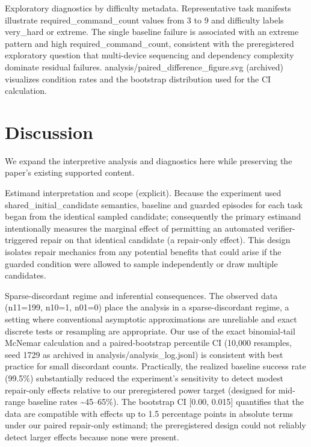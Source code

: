 \documentclass[conference]{IEEEtran}
\begin{document}
Exploratory diagnostics by difficulty metadata. Representative task manifests illustrate required\_command\_count values from 3 to 9 and difficulty labels very\_hard or extreme. The single baseline failure is associated with an extreme pattern and high required\_command\_count, consistent with the preregistered exploratory question that multi-device sequencing and dependency complexity dominate residual failures. analysis/paired\_difference\_figure.svg (archived) visualizes condition rates and the bootstrap distribution used for the CI calculation.

\section{Discussion}
We expand the interpretive analysis and diagnostics here while preserving the paper's existing supported content.

Estimand interpretation and scope (explicit). Because the experiment used shared\_initial\_candidate semantics, baseline and guarded episodes for each task began from the identical sampled candidate; consequently the primary estimand intentionally measures the marginal effect of permitting an automated verifier-triggered repair on that identical candidate (a repair-only effect). This design isolates repair mechanics from any potential benefits that could arise if the guarded condition were allowed to sample independently or draw multiple candidates.

Sparse-discordant regime and inferential consequences. The observed data (n11=199, n10=1, n01=0) place the analysis in a sparse-discordant regime, a setting where conventional asymptotic approximations are unreliable and exact discrete tests or resampling are appropriate. Our use of the exact binomial-tail McNemar calculation and a paired-bootstrap percentile CI (10,000 resamples, seed 1729 as archived in analysis/analysis\_log.jsonl) is consistent with best practice for small discordant counts. Practically, the realized baseline success rate (99.5\%) substantially reduced the experiment's sensitivity to detect modest repair-only effects relative to our preregistered power target (designed for mid-range baseline rates \textasciitilde{}45--65\%). The bootstrap CI [0.00, 0.015] quantifies that the data are compatible with effects up to 1.5 percentage points in absolute terms under our paired repair-only estimand; the preregistered design could not reliably detect larger effects because none were present.
\end{document}
